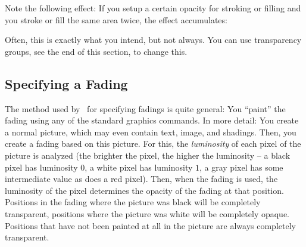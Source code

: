Note the following effect: If you setup a certain opacity for stroking
or filling and you stroke or fill the same area twice, the effect
accumulates:

\begin{codeexample}[]
\end{codeexample}

Often, this is exactly what you intend, but not always. You can use
transparency groups, see the end of this section, to change this.


\subsection{Specifying a Fading}

The method used by \pgfname\ for specifying fadings is quite
general: You ``paint'' the fading using any of the standard graphics
commands. In more detail: You create a normal picture, which may even
contain text, image, and shadings. Then, you create a fading based on
this picture. For this, the \emph{luminosity} of each pixel of the
picture is analyzed (the brighter the pixel, the higher the luminosity
-- a black pixel has luminosity $0$, a white pixel has luminosity $1$,
a gray pixel has some intermediate value as does a red pixel). Then,
when the fading is used, the luminosity of the pixel determines the
opacity of the fading at that position. Positions in the fading where
the picture was black will be completely transparent, positions where
the picture was white will be completely opaque. Positions that have
not been painted at all in the picture are always completely
transparent.


